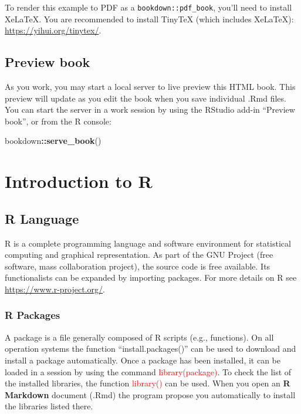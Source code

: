 \documentclass[
]{book}
\newenvironment{Shaded}{\begin{snugshade}}{\end{snugshade}}
\newcommand{\FunctionTok}[1]{\textcolor[rgb]{0.13,0.29,0.53}{\textbf{#1}}}
\newcommand{\NormalTok}[1]{#1}
\newcommand{\SpecialCharTok}[1]{\textcolor[rgb]{0.81,0.36,0.00}{\textbf{#1}}}
\theoremstyle{definition}
\theoremstyle{definition}
\theoremstyle{definition}
\theoremstyle{definition}
\theoremstyle{remark}
\begin{document}
To render this example to PDF as a \texttt{bookdown::pdf\_book}, you'll need to install XeLaTeX. You are recommended to install TinyTeX (which includes XeLaTeX): \url{https://yihui.org/tinytex/}.

\hypertarget{preview-book}{%
\section{Preview book}\label{preview-book}}

As you work, you may start a local server to live preview this HTML book. This preview will update as you edit the book when you save individual .Rmd files. You can start the server in a work session by using the RStudio add-in ``Preview book'', or from the R console:

\begin{Shaded}
\begin{Highlighting}[]
\NormalTok{bookdown}\SpecialCharTok{::}\FunctionTok{serve\_book}\NormalTok{()}
\end{Highlighting}
\end{Shaded}

\hypertarget{introduction-to-r}{%
\chapter{Introduction to R}\label{introduction-to-r}}

\hypertarget{r-language}{%
\section{R Language}\label{r-language}}

R is a complete programming language and software environment for statistical computing and graphical representation.
As part of the GNU Project (free software, mass collaboration project), the source code is free available.
Its functionalists can be expanded by importing packages.
For more details on R see \url{https://www.r-project.org/}.

\hypertarget{r-packages}{%
\subsection{R Packages}\label{r-packages}}

A package is a file generally composed of R scripts (e.g., functions).
On all operation systems the function ``install.packages()'' can be used to download and install a package automatically.
Once a package has been installed, it can be loaded in a session by using the command \textcolor{red}{library(package)}.
To check the list of the installed libraries, the function \textcolor{red}{library()} can be used.
When you open an \textbf{R Markdown} document (.Rmd) the program propose you automatically to install the libraries listed there.
\end{document}
